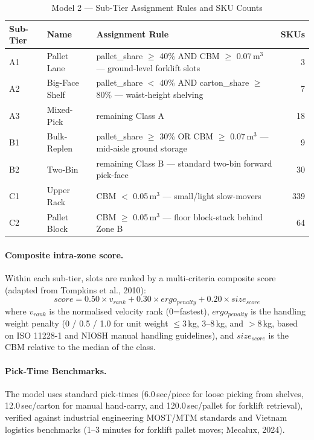 \documentclass[11pt]{article}
\begin{document}
\begin{table}[H]
\centering
\caption{Model 2 --- Sub-Tier Assignment Rules and SKU Counts}
\begin{tabular}{llp{6cm}r}
\toprule
Sub-Tier & Name & Assignment Rule & SKUs \\
\midrule
        A1 & Pallet Lane & pallet\_share $\geq$ 40\% AND CBM $\geq$ 0.07\,m$^3$ --- ground-level forklift slots & 3 \\
        A2 & Big-Face Shelf & pallet\_share $<$ 40\% AND carton\_share $\geq$ 80\% --- waist-height shelving & 7 \\
        A3 & Mixed-Pick & remaining Class A & 18 \\
        \midrule
        B1 & Bulk-Replen & pallet\_share $\geq$ 30\% OR CBM $\geq$ 0.07\,m$^3$ --- mid-aisle ground storage & 9 \\
        B2 & Two-Bin & remaining Class B --- standard two-bin forward pick-face & 30 \\
        \midrule
        C1 & Upper Rack & CBM $<$ 0.05\,m$^3$ --- small/light slow-movers & 339 \\
        C2 & Pallet Block & CBM $\geq$ 0.05\,m$^3$ --- floor block-stack behind Zone B & 64 \\
\bottomrule
\end{tabular}
\end{table}

\paragraph{Composite intra-zone score.}
Within each sub-tier, slots are ranked by a multi-criteria composite score (adapted from Tompkins et al., 2010):
\[
score = 0.50 \times v_{rank} + 0.30 \times ergo_{penalty} + 0.20 \times size_{score}
\]
where $v_{rank}$ is the normalised velocity rank (0=fastest), $ergo_{penalty}$ is the handling weight penalty (0 / 0.5 / 1.0 for unit weight $\leq$3\,kg, 3--8\,kg, and $>$8\,kg, based on ISO 11228-1 and NIOSH manual handling guidelines), and $size_{score}$ is the CBM relative to the median of the class.

\paragraph{Pick-Time Benchmarks.}
The model uses standard pick-times (6.0\,sec/piece for loose picking from shelves, 12.0\,sec/carton for manual hand-carry, and 120.0\,sec/pallet for forklift retrieval), verified against industrial engineering MOST/MTM standards and Vietnam logistics benchmarks (1--3 minutes for forklift pallet moves; Mecalux, 2024).
\end{document}
